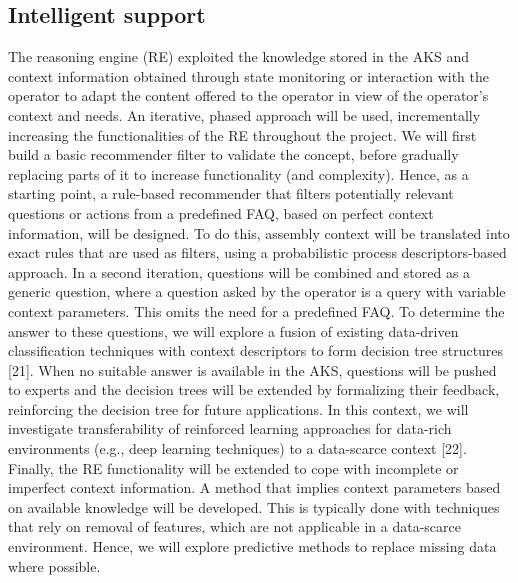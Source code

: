 \subsection{Intelligent support}
The reasoning engine (RE) exploited the knowledge stored in the AKS and context information obtained through state monitoring or interaction with the operator to adapt the content offered to the operator in view of the operator's context and needs. 
An iterative, phased approach will be used, incrementally increasing the functionalities of the RE throughout the project. 
We will first build a basic recommender filter to validate the concept, before gradually replacing parts of it to increase functionality (and complexity). Hence, as a starting point, a rule-based recommender that filters potentially relevant questions or actions from a predefined FAQ, based on perfect context information, will be designed. To do this, assembly context will be translated into exact rules that are used as filters, using a probabilistic process descriptors-based approach. 
In a second iteration, questions will be combined and stored as a generic question, where a question asked by the operator is a query with variable context parameters. This omits the need for a predefined FAQ. To determine the answer to these questions, we will explore a fusion of existing data-driven classification techniques with context descriptors to form decision tree structures [21]. When no suitable answer is available in the AKS, questions will be pushed to experts and the decision trees will be extended by formalizing their feedback, reinforcing the decision tree for future applications.
In this context, we will investigate transferability of reinforced learning approaches for data-rich environments (e.g., deep learning techniques) to a data-scarce context [22]. Finally, the RE functionality will be extended to cope with incomplete or imperfect context information. A method that implies context parameters based on available knowledge will be developed. This is typically done with techniques that rely on removal of features, which are not applicable in a data-scarce environment. Hence, we will explore predictive methods to replace missing data where possible.
